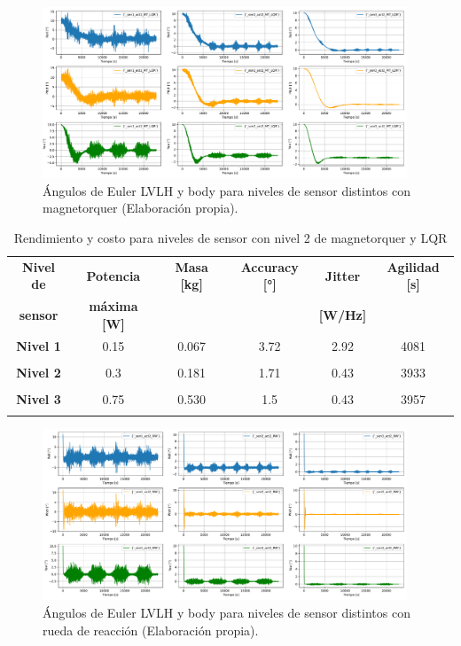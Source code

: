 \begin{figure}[H]
	\centering    
	\includegraphics[width=0.97\textwidth]{MT_LQR_sensores.pdf}
	\caption{Ángulos de Euler LVLH y body para niveles de sensor distintos con magnetorquer (Elaboración propia).}
	\label{fig:MT_LQR_sensores}
\end{figure}


\begin{table}[h!]
	\centering
	\caption{Rendimiento y costo para niveles de sensor con nivel 2 de magnetorquer y LQR}
	\begin{tabular}{|c|c|c|c|c|c|}
		\hline
		\textbf{Nivel de}   & \textbf{Potencia} & \textbf{Masa [kg]} & \textbf{Accuracy [°]} & \textbf{Jitter} & \textbf{Agilidad [s]}  \\ 
		\textbf{sensor}  & \textbf{máxima [W]} & & & \textbf{[W/Hz]} &  \\
		\hline
		\textbf{Nivel 1}   & 0.15  & 0.067  & 3.72 & 2.92 & 4081   \\
		&  &   &  &  &    \\
		\hline
		\textbf{Nivel 2}   & 0.3  & 0.181  & 1.71 & 0.43 & 3933   \\
		& & & & &   \\
		\hline
		\textbf{Nivel 3}   & 0.75  & 0.530  & 1.5 & 0.43 & 3957   \\
		& & & & &   \\
		\hline		
	\end{tabular}
	\label{tab:MT_LQR_sensores}
\end{table}

\begin{figure}[H]
	\centering    
	\includegraphics[width=0.97\textwidth]{RW_LQR_sensores.pdf}
	\caption{Ángulos de Euler LVLH y body para niveles de sensor distintos con rueda de reacción (Elaboración propia).}
	\label{fig:RW_LQR_sensores}
\end{figure}


